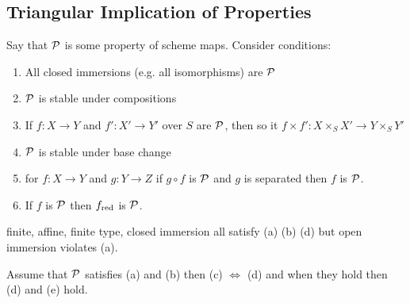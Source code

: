 \documentclass[12pt]{article}
\begin{document}
\subsection{Triangular Implication of Properties}

Say that $\mathcal{P}$ is some property of scheme maps. Consider conditions:
\begin{enumerate}
\item All closed immersions (e.g. all isomorphisms) are $\mathcal{P}$
\item $\mathcal{P}$ is stable under compositions
\item If $f : X \to Y$ and $f' : X' \to Y'$ over $S$ are $\mathcal{P}$, then so it $f \times f' : X \times_S X' \to Y \times_S Y'$
\item $\mathcal{P}$ is stable under base change
\item for $f : X \to Y$ and $g : Y \to Z$ if $g \circ f$ is $\mathcal{P}$ and $g$ is separated then $f$ is $\mathcal{P}$.
\item If $f$ is $\mathcal{P}$ then $f_{\mathrm{red}}$ is $\mathcal{P}$. 
\end{enumerate}

\begin{example}
finite, affine, finite type, closed immersion all satisfy (a) (b) (d) but open immersion violates (a). 
\end{example}

\begin{thm}
Assume that $\mathcal{P}$ satisfies (a) and (b) then (c) $\iff$ (d) and when they hold then (d) and (e) hold. 
\end{thm}

\newcommand{\pr}{\mathrm{pr}}
\end{document}
